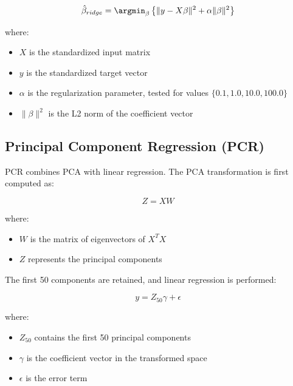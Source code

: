 \documentclass{article}
\begin{document}
        \begin{equation}
            \hat{\beta}_{ridge} = \argmin_{\beta} \left\{ \|y - X\beta\|^2 + \alpha\|\beta\|^2 \right\}
        \end{equation}
        
        where:
        \begin{itemize}
            \item $X$ is the standardized input matrix
            \item $y$ is the standardized target vector
            \item $\alpha$ is the regularization parameter, tested for values $\{0.1, 1.0, 10.0, 100.0\}$
            \item $\|\beta\|^2$ is the L2 norm of the coefficient vector
        \end{itemize}
        
        \subsection{Principal Component Regression (PCR)}
        PCR combines PCA with linear regression. The PCA transformation is first computed as:
        
        \begin{equation}
            Z = X W
        \end{equation}
        
        where:
        \begin{itemize}
            \item $W$ is the matrix of eigenvectors of $X^TX$
            \item $Z$ represents the principal components
        \end{itemize}
        
        The first 50 components are retained, and linear regression is performed:
        
        \begin{equation}
            y = Z_{50}\gamma + \epsilon
        \end{equation}
        
        where:
        \begin{itemize}
            \item $Z_{50}$ contains the first 50 principal components
            \item $\gamma$ is the coefficient vector in the transformed space
            \item $\epsilon$ is the error term
        \end{itemize}
        
\end{document}
